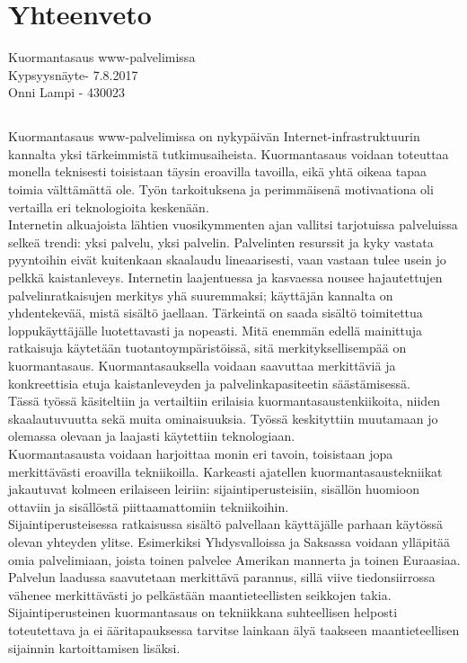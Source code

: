 \documentclass[a4paper, 12pt, finnish]{report}
\begin{document}
\chapter{Yhteenveto}
Kuormantasaus www-palvelimissa\\
Kypsyysnäyte- 7.8.2017\\
Onni Lampi - 430023

\section*{}

Kuormantasaus www-palvelimissa on nykypäivän Internet-infrastruktuurin kannalta yksi tärkeimmistä tutkimusaiheista.
Kuormantasaus voidaan toteuttaa monella teknisesti toisistaan täysin eroavilla tavoilla, eikä yhtä oikeaa tapaa toimia välttämättä ole.
Työn tarkoituksena ja perimmäisenä motivaationa oli vertailla eri teknologioita keskenään.\\

Internetin alkuajoista lähtien vuosikymmenten ajan vallitsi tarjotuissa palveluissa selkeä trendi: yksi palvelu, yksi palvelin.
Palvelinten resurssit ja kyky vastata pyyntoihin eivät kuitenkaan skaalaudu lineaarisesti, vaan vastaan tulee usein jo pelkkä kaistanleveys.
Internetin laajentuessa ja kasvaessa nousee hajautettujen palvelinratkaisujen merkitys yhä suuremmaksi;
käyttäjän kannalta on yhdentekevää, mistä sisältö jaellaan.
Tärkeintä on saada sisältö toimitettua loppukäyttäjälle luotettavasti ja nopeasti.
Mitä enemmän edellä mainittuja ratkaisuja käytetään tuotantoympäristöissä, sitä merkityksellisempää on kuormantasaus.
Kuormantasauksella voidaan saavuttaa merkittäviä ja konkreettisia etuja kaistanleveyden ja palvelinkapasiteetin säästämisessä.\\

Tässä työssä käsiteltiin ja vertailtiin erilaisia kuormantasaustenkiikoita, niiden skaalautuvuutta sekä muita ominaisuuksia.
Työssä keskityttiin muutamaan jo olemassa olevaan ja laajasti käytettiin teknologiaan.\\

Kuormantasausta voidaan harjoittaa monin eri tavoin, toisistaan jopa merkittävästi eroavilla tekniikoilla.
Karkeasti ajatellen kuormantasaustekniikat jakautuvat kolmeen erilaiseen leiriin: sijaintiperusteisiin,
sisällön huomioon ottaviin ja sisällöstä piittaamattomiin tekniikoihin.\\

Sijaintiperusteisessa ratkaisussa sisältö palvellaan käyttäjälle parhaan käytössä olevan yhteyden ylitse.
Esimerkiksi Yhdysvalloissa ja Saksassa voidaan ylläpitää omia palvelimiaan, joista toinen palvelee Amerikan mannerta ja toinen Euraasiaa.
Palvelun laadussa saavutetaan merkittävä parannus, sillä viive tiedonsiirrossa vähenee merkittävästi jo pelkästään maantieteellisten seikkojen takia.
Sijaintiperusteinen kuormantasaus on tekniikkana suhteellisen helposti toteutettava ja ei ääritapauksessa tarvitse lainkaan älyä taakseen maantieteellisen sijainnin kartoittamisen lisäksi.\\
\end{document}
